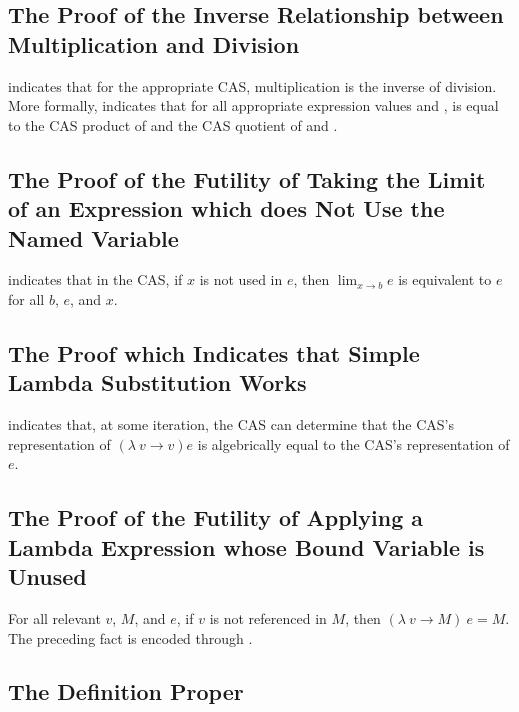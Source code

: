 \documentclass{report}
\begin{document}
\subsection{The Proof of the Inverse Relationship between Multiplication and Division}
 indicates that for the appropriate CAS, multiplication is the inverse of division.  More formally,   indicates that for all appropriate expression values  and ,  is equal to the  CAS product of  and the  CAS quotient of  and .

\subsection{The Proof of the Futility of Taking the Limit of an Expression which does Not Use the Named Variable}
  indicates that in the  CAS, if \(x\) is not used in \(e\), then \(\lim_{x \rightarrow b} e\) is equivalent to \(e\) for all \(b\), \(e\), and \(x\).

\subsection{The Proof which Indicates that Simple Lambda Substitution Works}
  indicates that, at some iteration, the  CAS can determine that the  CAS's representation of \(\left(\lambda\ v \rightarrow v\right) e\) is algebrically equal to the  CAS's representation of \(e\).

\subsection{The Proof of the Futility of Applying a Lambda Expression whose Bound Variable is Unused}
For all relevant \(v\), \(M\), and \(e\), if \(v\) is not referenced in \(M\), then \(\left(\lambda\ v \rightarrow M\right)\ e = M\).  The preceding fact is encoded through .

\subsection{The Definition Proper}
\end{document}
